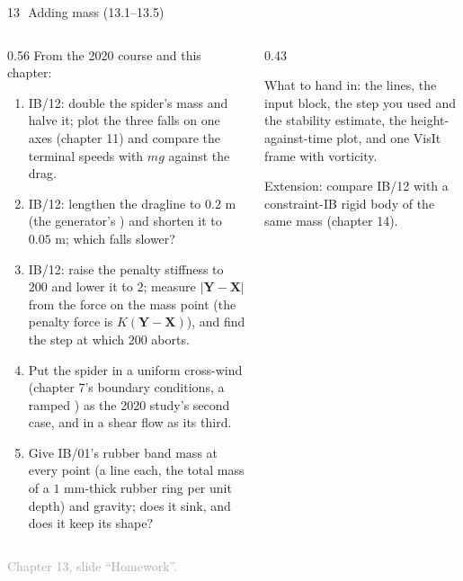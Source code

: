 \documentclass[aspectratio=169,11pt]{beamer}
\newcommand{\sourcecredit}[1]{\vfill\begin{flushright}\tiny\textcolor{DarkGray}{#1}\end{flushright}}
\begin{document}
\begin{frame}{13\,\textbullet\ Adding mass (13.1--13.5)}
\label{fr:c13x1}
\begin{columns}[T,onlytextwidth]
\begin{column}{0.56\textwidth}
\scriptsize From the 2020 course and this chapter:
\begin{enumerate}
  \item[13.1] IB/12: double the spider's mass and halve it; plot the three falls on one axes (chapter 11) and compare the terminal speeds with $m g$ against the drag.
  \item[13.2] IB/12: lengthen the dragline to $0.2$ m (the generator's ) and shorten it to $0.05$ m; which falls slower?
  \item[13.3] IB/12: raise the penalty stiffness to $200$ and lower it to $2$; measure $|\mathbf{Y} - \mathbf{X}|$ from the force on the mass point (the penalty force is $K(\mathbf{Y} - \mathbf{X})$), and find the step at which $200$ aborts.
  \item[13.4] Put the spider in a uniform cross-wind (chapter 7's boundary conditions, a ramped ) as the 2020 study's second case, and in a shear flow as its third.
  \item[13.5] Give IB/01's rubber band mass at every point (a  line each, the total mass of a $1$ mm-thick rubber ring per unit depth) and gravity; does it sink, and does it keep its shape?
\end{enumerate}
\end{column}
\begin{column}{0.43\textwidth}
\begin{punchbox}
\scriptsize What to hand in: the  lines, the input block, the step you used and the stability estimate, the height-against-time plot, and one VisIt frame with vorticity.
\end{punchbox}
\scriptsize {} Extension: compare IB/12 with a constraint-IB rigid body of the same mass (chapter 14).
\end{column}
\end{columns}
\sourcecredit{Chapter 13, slide ``Homework''.}
\end{frame}
\end{document}
